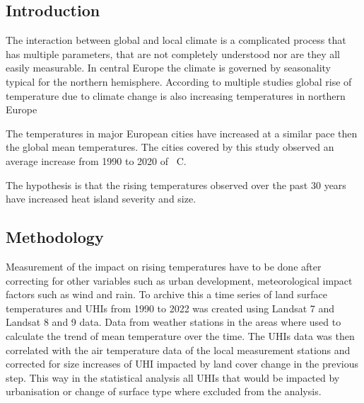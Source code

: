 \documentclass[12pt,a4paper, english]{article}
\begin{document}
    \subsection{Introduction}
       The interaction between global and local climate is a complicated process that has multiple parameters, that are not completely understood nor are they all easily measurable. 
       In central Europe the climate is governed by seasonality typical for the northern hemisphere.  
       According to multiple studies global rise of temperature due to climate change is also increasing temperatures in northern Europe~\autocite{Benestad2005}  %

       The temperatures in major European cities have increased at a similar pace then the global mean temperatures. 
       The cities covered by this study observed an average increase from 1990 to 2020 of %
       \textdegree\ C. 
   
       The hypothesis is that the rising temperatures observed over the past 30 years have increased heat island severity and size. 
    \subsection{Methodology}
      Measurement of the impact on rising temperatures have to be done after correcting for other variables such as urban development, meteorological impact factors such as wind and rain. 
      To archive this a time series of land surface temperatures and \glspl{UHI} from 1990 to 2022 was created using Landsat 7 and Landsat 8 and 9 data.
      Data from weather stations in the areas where used to calculate the trend of mean temperature over the time. 
      The \glspl{UHI} data was then correlated with the air temperature data of the local measurement stations and corrected for size increases of \gls{UHI} impacted by land cover change in the previous step. 
      This way in the statistical analysis all \glspl{UHI} that would be impacted by urbanisation or change of surface type where excluded from the analysis.
\end{document}

